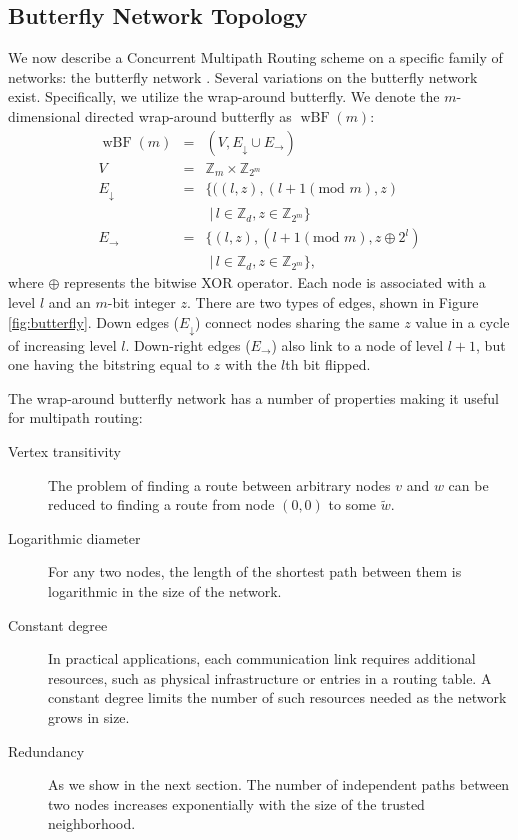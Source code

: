 \documentclass[prodmode,permissions]{acmsmall-ec16}
\newcommand{\beq}{\begin{eqnarray}}
\newcommand{\eeq}{\end{eqnarray}}
\DeclareMathOperator{\wbf}{wBF}
\begin{document}
\subsection{Butterfly Network Topology}

We now describe a Concurrent Multipath Routing scheme on a specific family
of networks: the butterfly network \cite{}.
Several variations on the butterfly network exist.
Specifically, we utilize the wrap-around butterfly.
We denote the $m$-dimensional directed wrap-around butterfly as $\wbf(m)$:
\beq
\wbf(m) &=& (V, E_\downarrow \cup E_\rightarrow) \\
V &=& \mathbb{Z}_m \times \mathbb{Z}_{2^m} \\
E_\downarrow &=& \{((l,z),(l+1 (\text{mod } m),z) \nonumber \\
&& \; | \, l \in \mathbb{Z}_d, z \in \mathbb{Z}_{2^m}\} \\
E_\rightarrow &=& \{(l,z),(l+1 (\text{mod } m), z \oplus 2^l) \nonumber \\
&& \; | \, l \in \mathbb{Z}_d, z \in \mathbb{Z}_{2^m}\},
\eeq
where $\oplus$ represents the bitwise XOR operator.
Each node is associated with a level $l$ and an $m$-bit integer $z$.
There are two types of edges, shown in Figure \ref{fig:butterfly}.
Down edges ($E_\downarrow$) connect nodes sharing the same $z$ value
in a cycle of increasing level $l$.
Down-right edges ($E_\rightarrow$) also link to a node of level $l + 1$,
but one having the bitstring equal to $z$ with the $l$th bit flipped.

The wrap-around butterfly network has a number of properties making it useful for multipath routing:
\begin{description}
\item[Vertex transitivity]
The problem
of finding a route between arbitrary nodes $v$ and $w$
can be reduced to finding a route from node $(0,0)$ to some $\tilde{w}$.
\item[Logarithmic diameter]
For any two nodes, the length of the shortest path between them is logarithmic
in the size of the network.
\item[Constant degree]
In practical applications, each communication link requires additional resources,
such as physical infrastructure or entries in a routing table.
A constant degree limits the number of such resources needed as the network
grows in size.
\item [Redundancy] 
As we show in the next section. The number of independent paths between two nodes increases exponentially with the size of the trusted neighborhood. 
\end{description}
\end{document}

